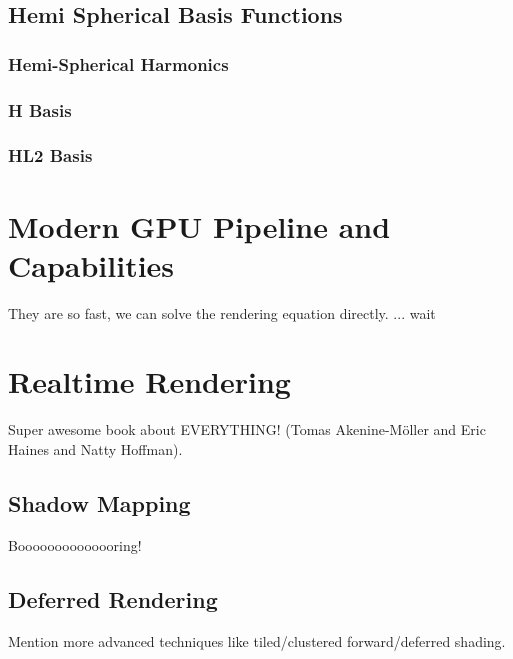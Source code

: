 \documentclass[thesis.tex]{subfiles}
\begin{document}
\subsection{Hemi Spherical Basis Functions}
\subsubsection{Hemi-Spherical Harmonics}
\subsubsection{H Basis}
\subsubsection{HL2 Basis}

\section{Modern GPU Pipeline and Capabilities}
They are so fast, we can solve the rendering equation directly. ... wait


\section{Realtime Rendering}
Super awesome book about EVERYTHING! \cite{bib:RealtimeRenderingBook} (Tomas Akenine-M\"{o}ller and Eric Haines and Natty Hoffman).

\subsection{Shadow Mapping}
Boooooooooooooring!

\subsection{Deferred Rendering}
Mention more advanced techniques like tiled/clustered forward/deferred shading.

\subfilebib %
\end{document}
